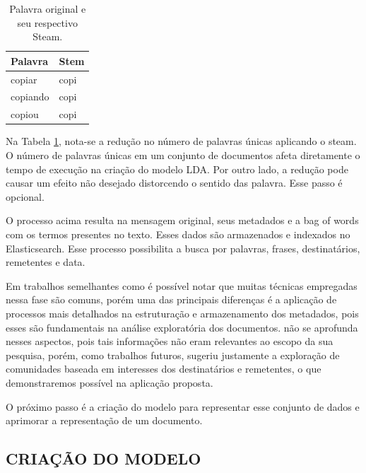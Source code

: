 \documentclass[12pt,a4paper]{article}
\begin{document}
\begin{table}[H]
  \centering
  \begin{tabular}{l l}
  Palavra		&Stem \\
  \hline
  copiar		&copi \\
  copiando		&copi \\
  copiou		&copi \\
  \hline
  \end{tabular}
  \caption{Palavra original e seu respectivo Steam.}
  \label{tab-stem}
\end{table}

Na Tabela \ref{tab-stem}, nota-se a redução no número de palavras únicas aplicando o steam. O número de palavras únicas em um conjunto de documentos afeta diretamente o tempo de execução na criação do modelo LDA.
 Por outro lado, a redução pode causar um efeito não desejado distorcendo o sentido das palavra. Esse passo é opcional.



O processo acima resulta na mensagem original, seus metadados e a bag of words com os termos presentes no texto. Esses dados são armazenados e indexados no Elasticsearch. Esse processo possibilita a busca por palavras, frases, destinatários, remetentes e data. 

Em trabalhos semelhantes como  é possível notar que muitas técnicas empregadas nessa fase são comuns, porém uma das principais diferenças
 é a aplicação de processos mais detalhados na estruturação e armazenamento dos metadados, pois esses são fundamentais na análise exploratória dos documentos.
  não se aprofunda nesses aspectos, pois tais informações não eram relevantes ao escopo da sua pesquisa,
 porém, como trabalhos futuros, sugeriu justamente a exploração de comunidades baseada em interesses dos destinatários e remetentes, o que demonstraremos possível na aplicação proposta.

O próximo passo é a criação do modelo para representar esse conjunto de dados e aprimorar a representação de um documento.



\subsection{CRIAÇÃO DO MODELO} \label{sec:criacao-modelo}
\end{document}
